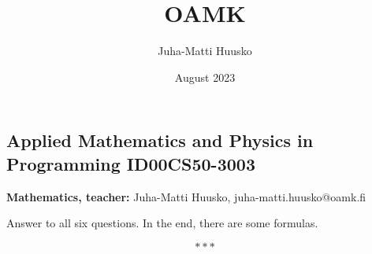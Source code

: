 \documentclass[12pt]{article}
\title{OAMK}
\author{Juha-Matti Huusko}
\date{August 2023}
\begin{document}

\subsection*{Applied Mathematics and Physics in Programming ID00CS50-3003}
\textbf{Mathematics, teacher:} Juha-Matti Huusko, juha-matti.huusko@oamk.fi

\noindent Answer to all six questions. In the end, there are some formulas.

$$
***
$$
\end{document}
